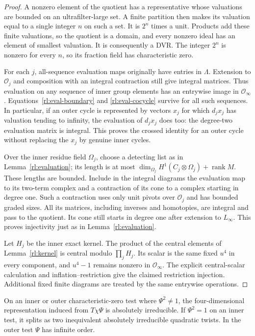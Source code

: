 \begin{proof}
A nonzero element of the quotient has a representative whose
valuations are bounded on an ultrafilter-large set.  A finite
partition then makes its valuation equal to a single integer $n$
on such a set.  It is $2^n$ times a unit.  Products add these finite
valuations, so the quotient is a domain, and every nonzero ideal has
an element of smallest valuation.  It is consequently a DVR.  The
integer $2^n$ is nonzero for every $n$, so its fraction field has
characteristic zero.

For each $j$, all-sequence evaluation maps originally have entries
in $\Lambda$.  Extension to $\mathcal O_j$ and composition with an
integral contraction still give integral matrices.  Thus evaluation
on any sequence of inner group elements has an entrywise image in
$\mathcal O_\infty$.  Equations~\eqref{rl:eval-boundary} and
\eqref{rl:eval-cocycle} survive for all such sequences.  In particular,
if an outer cycle is represented by vectors $x_j$ for which
$d_jx_j$ has valuation tending to infinity, the evaluation of
$d_jx_j$ does too: the degree-two evaluation matrix is integral.
This proves the crossed identity for an outer cycle without replacing
the $x_j$ by genuine inner cycles.

Over the inner residue field $\Omega_j$, choose a detecting list as
in Lemma~\ref{rl:evaluation}; its length is at most
$\dim_{\Omega_j}H^1(C_j\otimes\Omega_j)+\operatorname{rank}M$.
These lengths are bounded.  Include in the integral diagrams the
evaluation map to its two-term complex and a contraction of its cone
to a complex starting in degree one.  Such a contraction uses only
unit pivots over $\mathcal O_j$ and has bounded graded sizes.
All its matrices, including inverses and homotopies, are integral
and pass to the quotient.  Its cone still starts in degree one
after extension to $L_\infty$.  This proves injectivity just as in
Lemma~\ref{rl:evaluation}.

Let $H_j$ be the inner exact kernel.  The product of the central
elements of Lemma~\ref{rl:kernel} is central modulo $\prod_jH_j$.
Its scalar is the same fixed $u^4$ in every component, and
$u^4-1$ remains nonzero in $\mathcal O_\infty$.  The explicit
central-scalar calculation and inflation--restriction give the
claimed restriction injection.  Additional fixed finite diagrams
are treated by the same entrywise operations.
\end{proof}

\begin{lemma}
\label{rl:irreducibility}
On an inner or outer characteristic-zero test where $\Psi^2\ne1$,
the four-dimensional representation induced from $T\chi\Psi$ is
absolutely irreducible.  If $\Psi^2=1$ on an inner test, it splits
as two inequivalent absolutely irreducible quadratic twists.  In
the outer test $\Psi$ has infinite order.
\end{lemma}

